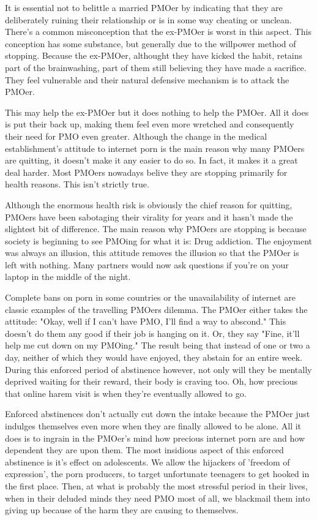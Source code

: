 It is essential not to belittle a married PMOer by indicating that they are deliberately ruining their relationship or is in some way cheating or unclean. There's a common misconception that the ex-PMOer is worst in this aspect. This conception has some substance, but generally due to the willpower method of stopping. Because the ex-PMOer, althought they have kicked the habit, retains part of the brainwashing, part of them still believing they have made a sacrifice. They feel vulnerable and their natural defensive mechanism is to attack the PMOer.

This may help the ex-PMOer but it does nothing to help the PMOer. All it does is put their back up, making them feel even more wretched and consequently their need for PMO even greater. Although the change in the medical establishment's attitude to internet porn is the main reason why many PMOers are quitting, it doesn't make it any easier to do so. In fact, it makes it a great deal harder. Most PMOers nowadays belive they are stopping primarily for health reasons. This isn't strictly true.

Although the enormous health risk is obviously the chief reason for quitting, PMOers have been sabotaging their virality for years and it hasn't made the slightest bit of difference. The main reason why PMOers are stopping is because society is beginning to see PMOing for what it is: Drug addiction. The enjoyment was always an illusion, this attitude removes the illusion so that the PMOer is left with nothing. Many partners would now ask questions if you're on your laptop in the middle of the night.

Complete bans on porn in some countries or the unavailability of internet are classic examples of the travelling PMOers dilemma. The PMOer either takes the attitude: "Okay, well if I can't have PMO, I'll find a way to abscond." This doesn't do them any good if their job is hanging on it. Or, they say "Fine, it'll help me cut down on my PMOing." The result being that instead of one or two a day, neither of which they would have enjoyed, they abstain for an entire week. During this enforced period of abstinence however, not only will they be mentally deprived waiting for their reward, their body is craving too. Oh, how precious that online harem visit is when they're eventually allowed to go.

Enforced abstinences don't actually cut down the intake because the PMOer just indulges themselves even more when they are finally allowed to be alone. All it does is to ingrain in the PMOer's mind how precious internet porn are and how dependent they are upon them. The most insidious aspect of this enforced abstinence is it's effect on adolescents. We allow the hijackers of 'freedom of expression', the porn producers, to target unfortunate teenagers to get hooked in the first place. Then, at what is probably the most stressful period in their lives, when in their deluded minds they need PMO most of all, we blackmail them into giving up because of the harm they are causing to themselves.

